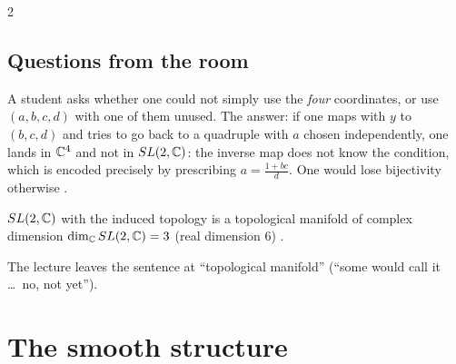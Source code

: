 \begin{paracol}{2}
\subsection{Questions from the room}\label{sec:sl-questions}
A student asks whether one could not simply use the \emph{four} coordinates, or use $(a,b,c,d)$ with one of them unused. The answer: if one maps with $y$ to $(b,c,d)$ and tries to go back to a quadruple with $a$ chosen independently, one lands in $\mathbb{C}^4$ and not in $SL(2,\mathbb{C})$: the inverse map does not know the condition, which is encoded precisely by prescribing $a=\frac{1+bc}{d}$. One would lose bijectivity otherwise      .

\begin{theorem}\label{thm:sl-topmanifold}
$SL(2,\mathbb{C})$ with the induced topology is a topological manifold of complex dimension $\dim_{\mathbb{C}}SL(2,\mathbb{C})=3$ (real dimension $6$)  .
\end{theorem}
The lecture leaves the sentence at ``topological manifold'' (``some would call it \dots\ no, not yet'').

\section{The smooth structure}\label{sec:sl-smooth}


\end{paracol}
